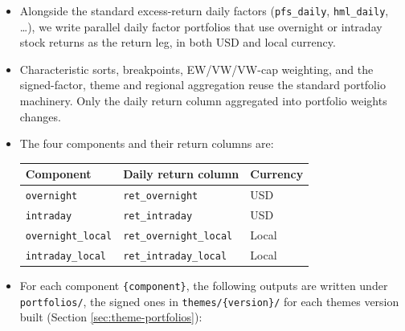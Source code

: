 \documentclass[12pt,title,fleqn]{article}
\begin{document}
\begin{itemize}
  \item Alongside the standard excess-return daily factors (\texttt{pfs\_daily}, \texttt{hml\_daily}, \ldots), we write parallel daily factor portfolios that use overnight or intraday stock returns as the return leg, in both USD and local currency.
  \item Characteristic sorts, breakpoints, EW/VW/VW-cap weighting, and the signed-factor, theme and regional aggregation reuse the standard portfolio machinery. Only the daily return column aggregated into portfolio weights changes.
  \item The four components and their return columns are:

  \begin{center}
  \begin{tabular}{|l|l|l|}
  \hline
  \textbf{Component} & \textbf{Daily return column} & \textbf{Currency} \\
  \hline
  \texttt{overnight} & \texttt{ret\_overnight} & USD \\
  \texttt{intraday} & \texttt{ret\_intraday} & USD \\
  \texttt{overnight\_local} & \texttt{ret\_overnight\_local} & Local \\
  \texttt{intraday\_local} & \texttt{ret\_intraday\_local} & Local \\
  \hline
  \end{tabular}
  \end{center}

  \item For each component \texttt{\{component\}}, the following outputs are written under \texttt{portfolios/}, the signed ones in \texttt{themes/\{version\}/} for each themes version built (Section \ref{sec:theme-portfolios}):


\end{itemize}
\end{document}
